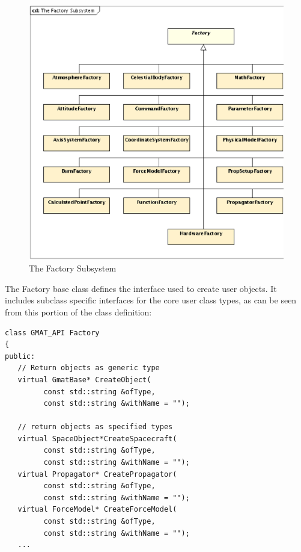 \begin{figure}[htb]
\centering
\includegraphics*[scale=0.55]{Images/TheFactorySubsystem.ps}
\caption{\label{fig:FactorySubsystem} The Factory Subsystem}
\end{figure}

The Factory base class defines the interface used to create user objects.  It includes subclass
specific interfaces for the core user class types, as can be seen from this portion of the class
definition:
\begin{scriptsize}
\begin{verbatim}
class GMAT_API Factory
{
public:
   // Return objects as generic type
   virtual GmatBase* CreateObject(
         const std::string &ofType,
         const std::string &withName = "");

   // return objects as specified types
   virtual SpaceObject*CreateSpacecraft(
         const std::string &ofType,
         const std::string &withName = "");
   virtual Propagator* CreatePropagator(
         const std::string &ofType,
         const std::string &withName = "");
   virtual ForceModel* CreateForceModel(
         const std::string &ofType,
         const std::string &withName = "");
   ...
\end{verbatim}
\end{scriptsize}

